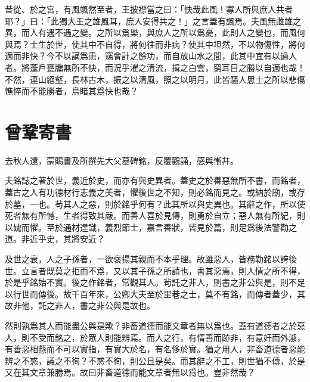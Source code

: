 昔從、於之宮，有風颯然至者，王披襟當之曰：「快哉此風！寡人所與庶人共者耶？」曰：「此獨大王之雄風耳，庶人安得共之！」之言蓋有諷焉。夫風無雌雄之異，而人有遇不遇之變。之所以爲樂，與庶人之所以爲憂，此則人之變也，而風何與焉？士生於世，使其中不自得，將何往而非病？使其中坦然，不以物傷性，將何適而非快？今不以謫爲患，{竊會計之餘功}，而自放山水之間，此其中宜有以過人者。將蓬戶甕牖無所不快，而況乎濯之清流，{揖}之白雲，窮耳目之勝以自適也哉！不然，連山絕壑，長林古木，振之以清風，照之以明月，此皆騷人思士之所以悲傷憔悴而不能勝者，烏睹其爲快也{哉}？ %

\theendnotes

\section[寄歐陽舍人書\quad{\small 曾鞏}]{{\normalsize 曾鞏}\quad 寄書}
去秋人還，蒙賜書及所撰先大父墓碑銘，反覆觀誦，感與慚幷。

夫銘誌之著於世，義近於史，而亦有與史異者。蓋史之於善惡無所不書，而銘者，蓋古之人有功德材行志義之美者，懼後世之不知，則必銘而見之。或納於廟，或存於墓，一也。茍其人之惡，則於銘乎何有？此其所以與史異也。其辭之作，所以使死者無有所憾，生者得致其嚴。而善人喜於見傳，則勇於自立；惡人無有所紀，則以媿而懼。至於通材達識，義烈節士，嘉言善狀，皆見於篇，則足爲後法警勸之道。非近乎史，其將安近？

及世之衰，人之子孫者，一欲褒揚其親而不本乎理。故雖惡人，皆務勒銘以誇後世。立言者既莫之拒而不爲，又以其子孫之所請也，書其惡焉，則人情之所不得，於是乎銘始不實。後之作銘者，常觀其人。茍託之非人，則書之非公與是，則不足以行世而傳後。故千百年來，公卿大夫至於里巷之士，莫不有銘，而傳者蓋少，其故非他，託之非人，書之非公與是故也。

然則孰爲其人而能盡公與是歟？非畜道德而能文章者無以爲也。蓋有道德者之於惡人，則不受而銘之，於眾人則能辨焉。而人之行，有情善而跡非，有意奸而外淑，有善惡相懸而不可以實指，有實大於名，有名侈於實。猶之用人，非畜道德者惡能辨之不惑，議之不徇？不惑不徇，則公且是矣。而其辭之不工，則世猶不傳，於是又在其文章兼勝焉。故曰非畜道德而能文章者無以爲也。豈非然哉？

